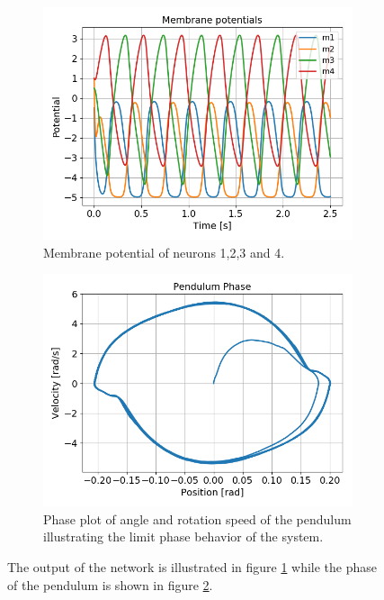 \documentclass{cmc}
\begin{document}
\begin{figure}[ht]
  \begin{subfigure}[b]{0.48\textwidth}
    \includegraphics[width=\textwidth]{figures/Exercise3/MembranePotentials.png}
    \caption{Membrane potential of neurons 1,2,3 and 4.}
    \label{fig:ex3-membrane-nominal}
  \end{subfigure}
  \begin{subfigure}[b]{0.48\textwidth}
    \includegraphics[width=\textwidth]{figures/Exercise3/PendulumPhase.png}
    \caption{Phase plot of angle and rotation speed of the pendulum illustrating the limit phase behavior of the system.}
    \label{fig:ex3-phase-nominal}
  \end{subfigure}
  \caption{The output of the network is illustrated in figure \ref{fig:ex3-membrane-nominal} while the phase of the pendulum is shown in figure \ref{fig:ex3-phase-nominal}.}
  \label{fig:ex3-nominal}
\end{figure}
\end{document}
